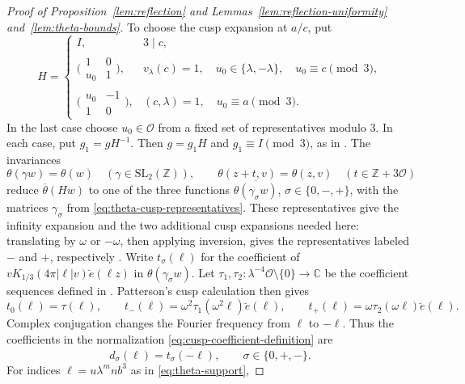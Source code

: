 \documentclass[11pt,a4paper]{article}
\numberwithin{equation}{section}
\numberwithin{figure}{section}
\theoremstyle{definition}
\theoremstyle{remark}
\newcommand{\OO}{\mathcal O}
\begin{document}
\begin{proof}[Proof of Proposition~\ref{lem:reflection} and Lemmas~\ref{lem:reflection-uniformity} and~\ref{lem:theta-bounds}]
To choose the cusp expansion at $a/c$, put
\[
 H=
 \begin{cases}
  I,&3\mid c,\\[2pt]
  \bigl(\begin{smallmatrix}1&0\\u_0&1\end{smallmatrix}\bigr),
     &v_\lambda(c)=1,\quad u_0\in\{\lambda,-\lambda\},\quad u_0\equiv c\pmod3,\\[2pt]
  \bigl(\begin{smallmatrix}u_0&-1\\1&0\end{smallmatrix}\bigr),
     &(c,\lambda)=1,\quad u_0\equiv a\pmod3.
 \end{cases}
\]
In the last case choose $u_0\in\OO$ from a fixed set of representatives
modulo $3$.
In each case, put $g_1=gH^{-1}$. Then $g=g_1H$ and $g_1\equiv I\pmod3$, as in \cite[\S5.1]{DR}. The invariances
\[
 \theta(\gamma w)=\theta(w)\quad(\gamma\in\mathrm{SL}_2(\mathbb Z)),
 \qquad \theta(z+t,v)=\theta(z,v)\quad(t\in\mathbb Z+3\OO)
\]
reduce $\overline\theta(Hw)$ to one of the three functions
$\overline{\theta(\gamma_\sigma w)}$, $\sigma\in\{0,-,+\}$, with the matrices $\gamma_\sigma$ from
\eqref{eq:theta-cusp-representatives}.
These representatives give the infinity expansion and the two
additional cusp expansions needed here:
translating by \(\omega\) or \(-\omega\), then applying inversion,
gives the representatives labeled $-$ and $+$, respectively
\cite[(5.9)--(5.15), Appendix~A]{DR}.
Write \(t_\sigma(\ell)\) for the coefficient of
\(vK_{1/3}(4\pi|\ell|v)\breve e(\ell z)\) in $\theta(\gamma_\sigma w)$.
Let $\tau_1,\tau_2:\lambda^{-4}\OO\setminus\{0\}\to\mathbb C$
be the coefficient sequences defined in \cite[(5.13), (5.14)]{DR}.
Patterson's cusp calculation \cite[Theorem~8.1 and Table~III]{Pat77}
then gives
\begin{equation}\label{eq:cusp-fourier-coefficients}
 t_0(\ell)=\tau(\ell),\qquad
 t_-(\ell)=\omega^2\tau_1(\omega^2\ell)\breve e(\ell),
 \qquad
 t_+(\ell)=\omega\tau_2(\omega\ell)\breve e(\ell).
\end{equation}
Complex conjugation changes the Fourier frequency from $\ell$ to
$-\ell$. Thus the coefficients in the normalization
\eqref{eq:cusp-coefficient-definition} are
\begin{equation}\label{eq:conjugate-cusp-coefficients}
 d_\sigma(\ell)=\overline{t_\sigma(-\ell)},\qquad \sigma\in\{0,+,-\}.
\end{equation}
For indices $\ell=u\lambda^mnb^3$ as in \eqref{eq:theta-support},

\end{proof}
\end{document}
